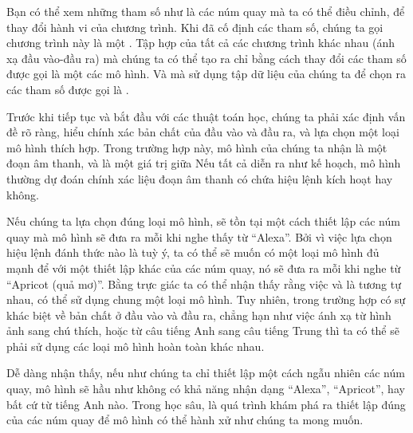 \documentclass[letterpaper,11pt,english]{sphinxmanual}
\begin{document}
Bạn có thể xem những tham số như là các núm quay mà ta có thể điều
chỉnh, để thay đổi hành vi của chương trình. Khi đã cố định các tham số,
chúng ta gọi chương trình này là một . Tập hợp của tất cả các
chương trình khác nhau (ánh xạ đầu vào-đầu ra) mà chúng ta có thể tạo ra
chỉ bằng cách thay đổi các tham số được gọi là một  các mô hình.
Và  mà sử dụng tập dữ liệu của chúng ta để chọn ra
các tham số được gọi là .







Trước khi tiếp tục và bắt đầu với các thuật toán học, chúng ta phải xác
định vấn đề rõ ràng, hiểu chính xác bản chất của đầu vào và đầu ra, và
lựa chọn một loại mô hình thích hợp. Trong trường hợp này, mô hình của
chúng ta nhận  là một đoạn âm thanh, và  là một giá trị
giữa  Nếu tất cả diễn ra như kế hoạch, mô hình thường dự
đoán chính xác liệu đoạn âm thanh có chứa hiệu lệnh kích hoạt hay không.



Nếu chúng ta lựa chọn đúng loại mô hình, sẽ tồn tại một cách thiết lập
các núm quay mà mô hình sẽ đưa ra  mỗi khi nghe thấy từ “Alexa”.
Bởi vì việc lựa chọn hiệu lệnh đánh thức nào là tuỳ ý, ta có thể sẽ muốn
có một loại mô hình đủ mạnh để với một thiết lập khác của các núm quay,
nó sẽ đưa ra  mỗi khi nghe từ “Apricot (quả mơ)”. Bằng trực giác
ta có thể nhận thấy rằng việc  và  là tương tự nhau, có thể sử dụng chung một loại mô hình. Tuy
nhiên, trong trường hợp có sự khác biệt về bản chất ở đầu vào và đầu ra,
chẳng hạn như việc ánh xạ từ hình ảnh sang chú thích, hoặc từ câu tiếng
Anh sang câu tiếng Trung thì ta có thể sẽ phải sử dụng các loại mô hình
hoàn toàn khác nhau.



Dễ dàng nhận thấy, nếu như chúng ta chỉ thiết lập một cách ngẫu nhiên
các núm quay, mô hình sẽ hầu như không có khả năng nhận dạng “Alexa”,
“Apricot”, hay bất cứ từ tiếng Anh nào. Trong học sâu,  là quá
trình khám phá ra thiết lập đúng của các núm quay để mô hình có thể hành
xử như chúng ta mong muốn.
\end{document}
